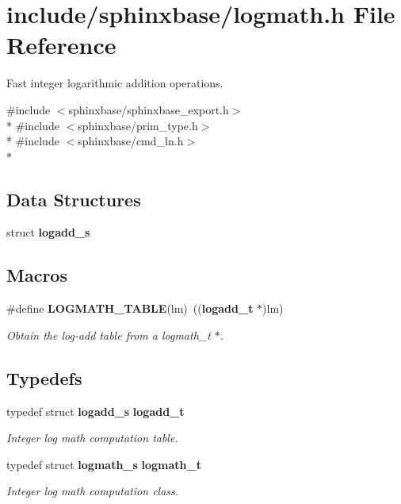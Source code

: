 \section{include/sphinxbase/logmath.h File Reference}
\label{logmath_8h}


Fast integer logarithmic addition operations.  


{\ttfamily \#include $<$sphinxbase/sphinxbase\+\_\+export.\+h$>$}\\*
{\ttfamily \#include $<$sphinxbase/prim\+\_\+type.\+h$>$}\\*
{\ttfamily \#include $<$sphinxbase/cmd\+\_\+ln.\+h$>$}\\*
\subsection*{Data Structures}
\begin{DoxyCompactItemize}
\item 
struct {\bf logadd\+\_\+s}
\end{DoxyCompactItemize}
\subsection*{Macros}
\begin{DoxyCompactItemize}
\item 
\#define {\bf L\+O\+G\+M\+A\+T\+H\+\_\+\+T\+A\+B\+L\+E}(lm)~(({\bf logadd\+\_\+t} $\ast$)lm)\label{logmath_8h_ae5c5ce106e9f8f1e763d419de53317a8}

\begin{DoxyCompactList}\small\item\em Obtain the log-\/add table from a logmath\+\_\+t $\ast$. \end{DoxyCompactList}\end{DoxyCompactItemize}
\subsection*{Typedefs}
\begin{DoxyCompactItemize}
\item 
typedef struct {\bf logadd\+\_\+s} {\bf logadd\+\_\+t}
\begin{DoxyCompactList}\small\item\em Integer log math computation table. \end{DoxyCompactList}\item 
typedef struct {\bf logmath\+\_\+s} {\bf logmath\+\_\+t}\label{logmath_8h_ae613aa7db1dd40ff56a80a7dadb22cc8}

\begin{DoxyCompactList}\small\item\em Integer log math computation class. \end{DoxyCompactList}\end{DoxyCompactItemize}
